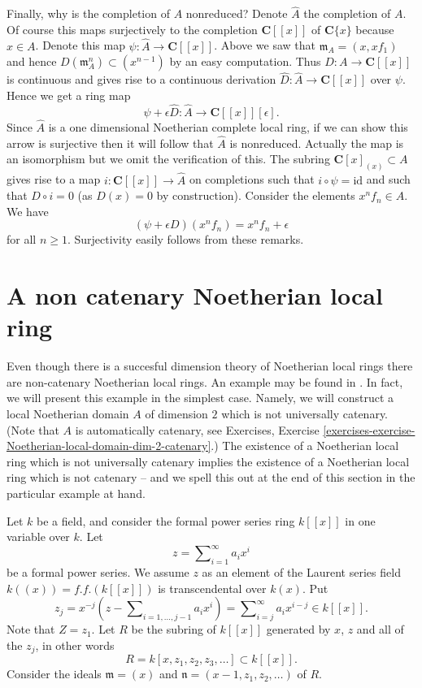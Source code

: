 \medskip\noindent
Finally, why is the completion of $A$ nonreduced? Denote $\hat A$ the
completion of $A$. Of course this maps surjectively to the completion
$\mathbf{C}[[x]]$ of $\mathbf{C}\{x\}$ because $x \in A$. Denote
this map $\psi : \hat A \to \mathbf{C}[[x]]$.
Above we saw that $\mathfrak m_A = (x, xf_1)$
and hence $D(\mathfrak m_A^n) \subset (x^{n - 1})$ by an easy
computation. Thus $D : A \to \mathbf{C}[[x]]$ is continuous and
gives rise to a continuous derivation $\hat D : \hat A \to \mathbf{C}[[x]]$
over $\psi$. Hence we get a ring map
$$
\psi + \epsilon \hat D :
\hat A
\longrightarrow
\mathbf{C}[[x]][\epsilon].
$$
Since $\hat A$ is a one dimensional Noetherian complete local ring, if we
can show this arrow is surjective then it will follow that $\hat A$
is nonreduced. Actually the map is an isomorphism but we omit the
verification of this. The subring $\mathbf{C}[x]_{(x)} \subset A$
gives rise to a map $i : \mathbf{C}[[x]] \to \hat A$ on completions such
that $i \circ \psi = \text{id}$ and such that $D \circ i = 0$
(as $D(x) = 0$ by construction). Consider the elements $x^nf_n \in A$.
We have
$$
(\psi + \epsilon D)(x^nf_n) = x^n f_n + \epsilon
$$
for all $n \geq 1$. Surjectivity easily follows from these remarks.




\section{A non catenary Noetherian local ring}
\label{section-non-catenary-Noetherian-local}

\noindent
Even though there is a succesful dimension theory of Noetherian local rings
there are non-catenary Noetherian local rings. An example may be found in
\cite[Appendix, Example 2]{Nagata}. In fact, we will present this example
in the simplest case. Namely, we will construct a local Noetherian domain $A$
of dimension $2$ which is not universally catenary. (Note that $A$ is
automatically catenary, see
Exercises, Exercise
\ref{exercises-exercise-Noetherian-local-domain-dim-2-catenary}.)
The existence of a Noetherian local ring which is not universally
catenary implies the existence of a Noetherian local ring which
is not catenary -- and we spell this out at the end of this section
in the particular example at hand.

\medskip\noindent
Let $k$ be a field, and consider the formal power series ring
$k[[x]]$ in one variable over $k$. Let
$$
z = \sum\nolimits_{i = 1}^\infty a_i x^i
$$
be a formal power series. We assume $z$ as an element of the Laurent
series field $k((x)) = f.f.(k[[x]])$ is transcendental over $k(x)$.
Put
$$
z_j
=
x^{-j}(z - \sum\nolimits_{i = 1, \ldots, j - 1} a_i x^i)
=
\sum\nolimits_{i = j}^\infty a_i x^{i - j}
\in k[[x]].
$$
Note that $Z = z_1$.
Let $R$ be the subring of $k[[x]]$ generated by $x$, $z$ and all of the
$z_j$, in other words
$$
R = k[x, z_1, z_2, z_3, \ldots ] \subset k[[x]].
$$
Consider the ideals $\mathfrak m = (x)$ and
$\mathfrak n = (x - 1, z_1, z_2, \ldots)$ of $R$.

